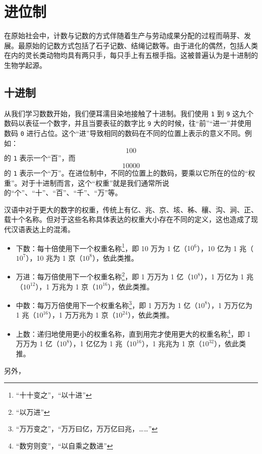 \section{进位制}\label{sec:ArithBasics/positional-notation}
    在原始社会中，计数与记数的方式伴随着生产与劳动成果分配的过程而萌芽、发展。最原始的记数方式包括了石子记数、结绳记数等。由于进化的偶然，包括人类在内的灵长类动物均具有两只手，每只手上有五根手指。这被普遍认为是十进制的生物学起源。\\
    \subsection{十进制}\label{subsec:ArithBasics/positional-notation/decimal}
        从我们学习数数开始，我们便耳濡目染地接触了十进制。我们使用 \texttt{1} 到 \texttt{9} 这九个数码以表征一个数字，并且当要表征的数字比 \texttt{9} 大的时候，往“前”“进一”并使用数码 \texttt{0} 进行占位。这个“进”导致相同的数码在不同的位置上表示的意义不同。例如：\[100\]的 \texttt{1} 表示一个“百”，而\[10000\]的 \texttt{1} 表示一个“万”。在进位制中，不同的位置上的数码，要乘以它所在的位的“权重”。对于十进制而言，这个“权重”就是我们通常所说的“个”、“十”、“百”、“千”、“万”等。
        \begin{displayquote}
            汉语中对于更大的数字的权重，传统上有亿、兆、京、垓、秭、穰、沟、涧、正、载十个名称。但对于这些名称具体表达的权重大小存在不同的定义，这也造成了现代汉语表达上的混淆。\\
            \begin{itemize}
                \item 下数：每十倍使用下一个权重名称\footnote{“十十变之”\cite[卷上 12]{wujin}，“以十进”\cite[卷一 15]{shulijinyun}}，即 10 万为 1 亿（$10^6$），10 亿为 1 兆（$10^7$），10 兆为 1 京（$10^8$），依此类推。
                \item 万进：每万倍使用下一个权重名称\footnote{“以万进”\cite[卷一 15]{shulijinyun}}，即 1 万万为 1 亿（$10^8$），1 万亿为 1 兆（$10^{12}$），1 万兆为 1 京（$10^{16}$），依此类推。
                \item 中数：每万万倍使用下一个权重名称\footnote{“万万变之”\cite[卷上 12]{wujin}，“万万曰亿，万万亿曰兆，……”\cite[卷上 3]{sunzi}}，即 1 万万为 1 亿（$10^8$），1 万万亿为 1 兆（$10^{16}$），1 万万兆为 1 京（$10^{24}$），依此类推。
                \item 上数：递归地使用更小的权重名称，直到用完才使用更大的权重名称\footnote{“数穷则变”\cite[卷上 12]{wujin}，“以自乘之数进”\cite[卷上 15]{shulijinyun}}，即 1 万万为 1 亿（$10^8$），1 亿亿为 1 兆（$10^{16}$），1 兆兆为 1 京（$10^{32}$），依此类推。
            \end{itemize}
            另外，
        \end{displayquote}

